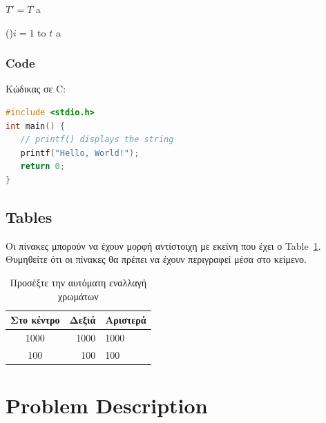 \documentclass[a4paper,11pt]{article}
\begin{document}
 \begin{algorithm}[t]
 \scriptsize
 \BlankLine

 $T' =T$ 
  {
 a
 }

 \For(){$i=1$ to $t$}{ \label{alg:tCM:for}%
 a
 }
\caption{My first algorithm}
\label{alg:first}
 \end{algorithm}

%
\subsubsection{Code}\label{sec:code}
Κώδικας σε C:
\begin{lstlisting}[language=C]
#include <stdio.h>
int main() {
   // printf() displays the string
   printf("Hello, World!");
   return 0;
}
\end{lstlisting}



\subsection{Tables}\label{sec:tables}
Οι πίνακες μπορούν να έχουν μορφή αντίστοιχη με εκείνη που έχει ο Table~\ref{tab:example}. Θυμηθείτε ότι οι πίνακες θα πρέπει να έχουν περιγραφεί μέσα στο κείμενο.

\begin{table}
\centering
{}
\begin{tabular}{|c|r|l|}\hline
\rowcolor{gray}
Στο κέντρο & Δεξιά & Αριστερά \\\hline\hline
    1000 & 1000 & 1000 \\\hline
    100 & 100 & 100 \\ \hline
\end{tabular}
\caption{Προσέξτε την αυτόματη εναλλαγή χρωμάτων}
\label{tab:example}
\end{table}

%
%
\section{Problem Description}\label{sec:descr}
\end{document}
